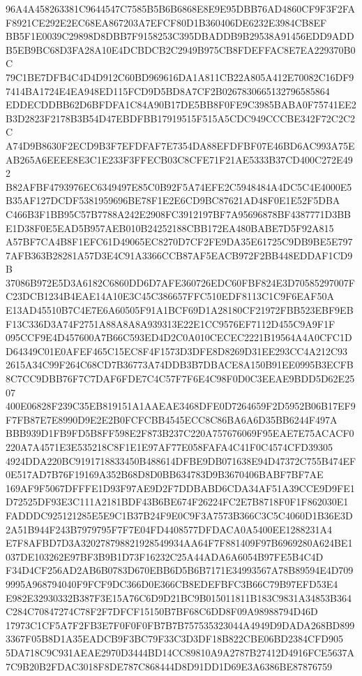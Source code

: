 \documentclass[UTF8,fontset=fandol,zihao=-4,a4paper]{ctexart}
\begin{document}
{{96A4A458263381C9644547C7585B5B6B6868E8E9E95DBB76AD4860CF9F3F2FAF8921CE292E2EC68EA867203A7EFCF80D1B360406DE6232E3984CB8EF
BB5F1E0039C29898D8DBB7F9158253C395DBADDB9B29538A91456EDD9ADDB5EB9BC68D3FA28A10E4DCBDCB2C2949B975CB8FDEFFAC8E7EA229370B0C
79C1BE7DFB4C4D4D912C60BD969616DA1A811CB22A805A412E70082C16DF97414BA1724E4EA948ED115FCD9D5BD8A7CF2B0267830665132796585864
EDDECDDBB62D6BFDFA1C84A90B17DE5BB8F0FE9C3985BABA0F75741EE2B3D2823F2178B3B54D47EBDFBB17919515F515A5CDC949CCCBE342F72C2C2C
A74D9B8630F2ECD9B3F7EFDFAF7E7354DA88EFDFBF07E46BD6AC993A75EAB265A6EEEE8E3C1E233F3FFECB03C8CFE71F21AE5333B37CD400C272E492
B82AFBF4793976EC6349497E85C0B92F5A74EFE2C5948484A4DC5C4E4000E5B35AF127DCDF5381959696BE78F1E2E6CD9BC87621AD48F0E1E52F5DBA
C466B3F1BB95C57B7788A242E2908FC3912197BF7A95696878BF4387771D3BBE1D38F0E5EAD5B957AEB010B24252188CBB172EA480BABE7D5F92A815
A57BF7CA4B8F1EFC61D49065EC8270D7CF2FE9DA35E61725C9DB9BE5E7977AFB363B28281A57D3E4C91A3366CCB87AF5EACB972F2BB448EDDAF1CD9B
37086B972E5D3A6182C6860DD6D7AFE360726EDC60FBF824E3D70585297007FC23DCB1234B4EAE14A10E3C45C386657FFC510EDF8113C1C9F6EAF50A
E13AD45510B7C4E7E6A60505F91A1BCF69D1A28180CF21972FBB523EBF9EBF13C336D3A74F2751A88A8A8A939313E22E1CC9576EF7112D455C9A9F1F
095CCF9E4D457600A7B66C593ED4D2C0A010CECEC2221B19564A4A0CFC1DD64349C01E0AFEF465C15EC8F4F1573D3DFE8D8269D31EE293CC4A212C93
2615A34C99F264C68CD7B36773A74DDB3B7DBACE8A150B91EE0995B3ECFB8C7CC9DBB76F7C7DAF6FDE7C4C57F7F6E4C98F0D0C3EEAE9BDD5D62E2507
400E06828F239C35EB819151A1AAEAE3468DFE0D7264659F2D5952B06B17EF9F7FB87E7E8990D9E2E2B0FCFCBB4545ECC8C86BA6A6D35BB6244F497A
BBB939D1FB9FD5B8FF598E2F873B237C220A757676069F95EAE7E75ACACF0220A7A4571E3E535218C8F1E1E97AF77E058FAFA4C41F0C4574CFD39305
4924DDA220BC9191718833450B488614DFBE9DB071638E94D47372C755B474EF0E517AD7B76F19169A352B68D8D0BB634783D9B3670406BABF7BF7AE
169AF9F5067DFFFE1D93F97AE9D2F7DDBABD6CDA34AF51A39CCE9D9FE1D72525DF93E3C111A2181BDF43B6BE674F26224FC2E7B8718F0F1F862030E1
FADDDC925121285E5E9C1B37B24F9E0C9F3A7573B366C3C5C4060D1B36E3D2A51B944F243B7979795F7F7E04FD4408577DFDACA0A5400EE1288231A4
E7F8AFBD7D3A320278798821928549934AA64F7F881409F97B6969280A624BE1037DE103262E97BF3B9B1D73F16232C25A44ADA6A6054B97FE5B4C4D
F34D4CF256AD2AB6B0783D670EBB6D5B6B7171E34993567A78B89594E4D7099995A968794040F9FCF9DC366D0E366CB8EDEFBFC3B66C79B97EFD53E4
E982E32930332B387F3E15A76C6D9D21BC9B015011811B183C9831A34853B364C284C70847274C78F2F7DFCF15150B7BF68C6DD8F09A98988794D46D
17973C1CF5A7F2FB3E7F0F0F0FB7B7B757535323044A4949D9DADA268BD8993367F05B8D1A35EADCB9F3BC79F33C3D3DF18B822CBE06BD2384CFD905
5DA718C9C931AEAE2970D3444BD14CC89810A9A2787B27412D4916FCE5637A7C9B20B2FDAC3018F8DE787C868444D8D91DD1D69E3A6386BE87876759
}}
\end{document}
